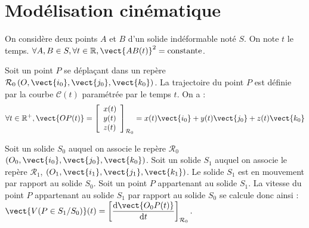 \setchapterpreamble[u]{\margintoc}

%
\section{Modélisation cinématique}
\marginnote[8cm]{
}

% 


\begin{defi} 
On considère deux points $A$ et $B$ d'un solide indéformable noté $S$. On note $t$ le temps. $
\forall A,B \in S, \forall t\in \mathbb{R}, \vect{AB(t)}^2 = \text{constante}
$.

\end{defi}

\begin{defi} 

Soit un point $P$ se déplaçant dans un repère $\mathcal{R}_0 \left(O,\vect{i_0},\vect{j_0},\vect{k_0} \right)$. La trajectoire du point $P$ est définie par la courbe $\mathcal{C}(t)$ paramétrée par le temps $t$. On a : 
$$
\forall t\in \mathbb{R}^+, \vect{OP(t)}=
\left[
\begin{array}{l}
x(t)\\
y(t)\\
z(t)\\
\end{array}
\right]_{\mathcal{R}_0}
=x(t)\vect{i_0}+y(t)\vect{j_0}+z(t)\vect{k_0}
$$
\end{defi}



\begin{defi} 

Soit un solide $S_0$ auquel on associe le repère $\mathcal{R}_0$ $\left(O_0,\vect{i_0},\vect{j_0},\vect{k_0} \right)$.  Soit un solide $S_1$ auquel on associe le repère $\mathcal{R}_1$,  $\left(O_1,\vect{i_1},\vect{j_1},\vect{k_1} \right)$. Le solide $S_1$ est en mouvement par rapport au solide $S_0$. 
Soit un point $P$ appartenant au solide $S_1$. La vitesse du point $P$ appartenant au solide $S_1$ par rapport au solide $S_0$ se calcule donc ainsi : $
\vect{V(P\in S_1/S_0)}(t) = \left[\dfrac{\text{d}\vect{O_0P(t)}}{\text{d}t}\right]_{\mathcal{R}_0}.
$
\end{defi}

